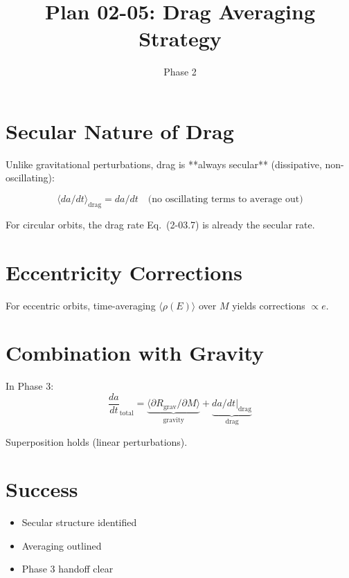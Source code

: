 \documentclass[11pt]{article}
\title{Plan 02-05: Drag Averaging Strategy}
\date{Phase 2}
\begin{document}
\maketitle

\section{Secular Nature of Drag}

Unlike gravitational perturbations, drag is **always secular** (dissipative, non-oscillating):

$$\langle da/dt \rangle_{\text{drag}} = da/dt \quad \text{(no oscillating terms to average out)}$$

For circular orbits, the drag rate Eq.~(2-03.7) is already the secular rate.

\section{Eccentricity Corrections}

For eccentric orbits, time-averaging $\langle \rho(E) \rangle$ over $M$ yields corrections $\propto e$.

\section{Combination with Gravity}

In Phase 3:
$$\frac{da}{dt}_{\text{total}} = \underbrace{\langle \partial R_{\text{grav}}/\partial M \rangle}_{\text{gravity}} + \underbrace{da/dt|_{\text{drag}}}_{\text{drag}}$$

Superposition holds (linear perturbations).

\section{Success}
\begin{itemize}
\item[$\checkmark$] Secular structure identified
\item[$\checkmark$] Averaging outlined
\item[$\checkmark$] Phase 3 handoff clear
\end{itemize}
\end{document}
